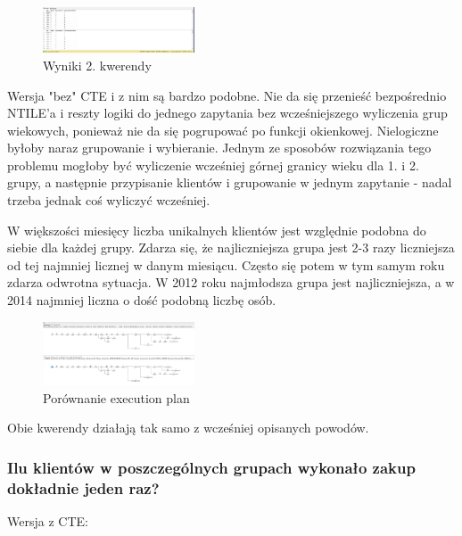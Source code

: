 \documentclass[a4paper,12pt]{article}
\begin{document}
\begin{figure}[H]
	\centering
	\includegraphics[width=0.4\textwidth]{images/2.png}
	\caption{Wyniki 2. kwerendy}
\end{figure}

Wersja "bez" CTE i z nim są bardzo podobne. Nie da się przenieść bezpośrednio NTILE'a i reszty logiki do jednego zapytania bez wcześniejszego wyliczenia grup wiekowych, ponieważ nie da się pogrupować po funkcji okienkowej. Nielogiczne byłoby naraz grupowanie i wybieranie. Jednym ze sposobów rozwiązania tego problemu mogłoby być wyliczenie wcześniej górnej granicy wieku dla 1. i 2. grupy, a następnie przypisanie klientów i grupowanie w jednym zapytanie - nadal trzeba jednak coś wyliczyć wcześniej.

W większości miesięcy liczba unikalnych klientów jest względnie podobna do siebie dla każdej grupy. Zdarza się, że najliczniejsza grupa jest 2-3 razy liczniejsza od tej najmniej licznej w danym miesiącu. Często się potem w tym samym roku zdarza odwrotna sytuacja. W 2012 roku najmłodsza grupa jest najliczniejsza, a w 2014 najmniej liczna o dość podobną liczbę osób.

\begin{figure}[H]
	\centering
	\includegraphics[width=0.4\textwidth]{images/2_execution_plan.png}
	\caption{Porównanie execution plan}
\end{figure}

Obie kwerendy działają tak samo z wcześniej opisanych powodów.

\subsubsection{Ilu klientów w poszczególnych grupach wykonało zakup dokładnie jeden raz?}

Wersja z CTE:
\end{document}
